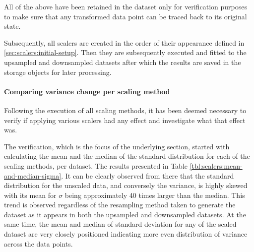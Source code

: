 All of the above have been retained in the dataset only for verification purposes to make sure that any transformed data point can be traced back to its original state.

Subsequently, all scalers are created in the order of their appearance defined in \ref{sec:scalers:initial-setup}. Then they are subsequently executed and fitted to the upsampled and downsampled datasets after which the results are saved in the storage objects for later processing.

\paragraph{Comparing variance change per scaling method}
Following the execution of all scaling methods, it has been deemed necessary to verify if applying various scalers had any effect and investigate what that effect was.

The verification, which is the focus of the underlying section, started with calculating the mean and the median of the standard distribution for each of the scaling methods, per dataset. The results presented in Table \ref{tbl:scalers:mean-and-median-sigma}. It can be clearly observed from there that the standard distribution for the unscaled data, and conversely the variance, is highly skewed with its mean for $\sigma$ being approximately 40 times larger than the median. This trend is observed regardless of the resampling method taken to generate the dataset as it appears in both the upsampled and downsampled datasets. At the same time, the mean and median of standard deviation for any of the scaled dataset are very closely positioned indicating more even distribution of variance across the data points.

